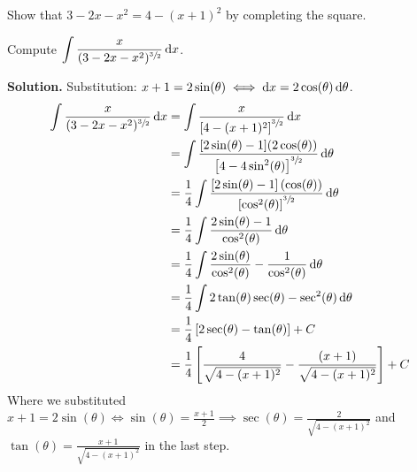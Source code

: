 \begin{Exercise}{}{}
    Show that $ 3-2x-x^2=4-(x+1)^2 $ by completing the square.
\end{Exercise}
\begin{Example}{}{}
    Compute $ \displaystyle \int \frac{x}{(3-2x-x^2)^{\sfrac{3}{2}}} \odif{x} $.

    \textbf{Solution.}
    Substitution: $ x+1=2\sin(\theta)\iff \odif{x}=2\cos(\theta)\odif{\theta} $.
    \begin{align*}
        \int \frac{x}{(3-2x-x^2)^{\sfrac{3}{2}}} \odif{x}
         & =\int \frac{x}{\left[ 4-(x+1)^2 \right]^{\sfrac{3}{2}}} \odif{x}                                                                \\
         & =\int \frac{[2\sin(\theta)-1] (2\cos(\theta))}{\left[4-4\sin^2(\theta)\right]^{\sfrac{3}{2}}} \odif{\theta}                     \\
         & =\frac{1}{4} \int \frac{[2\sin(\theta)-1]\left(\cos(\theta)\right)}{\left[ \cos^2(\theta) \right]^{\sfrac{3}{2}}} \odif{\theta} \\
         & = \frac{1}{4} \int \frac{2\sin(\theta)-1}{\cos^2(\theta)} \odif{\theta}                                                         \\
         & =\frac{1}{4} \int \frac{2\sin(\theta)}{\cos^2(\theta)}-\frac{1}{\cos^2(\theta)} \odif{\theta}                                   \\
         & =\frac{1}{4} \int 2\tan(\theta)\sec(\theta)-\sec^2(\theta)\odif{\theta}                                                         \\
         & =\frac{1}{4} \left[ 2\sec(\theta)-\tan(\theta) \right]+C                                                                        \\
         & =\frac{1}{4} \left[ \frac{4}{\sqrt{4-(x+1)^2}}-\frac{(x+1)}{\sqrt{4-(x+1)^2}} \right]+C
    \end{align*}
    Where we substituted $ \displaystyle
        x+1=2\sin(\theta)\iff \sin(\theta)=\frac{x+1}{2}\implies
        \sec(\theta)=\frac{2}{\sqrt{4-(x+1)^2}} $ and $
        \displaystyle \tan(\theta)=\frac{x+1}{\sqrt{4-(x+1)^2}} $
    in the last step.
\end{Example}

